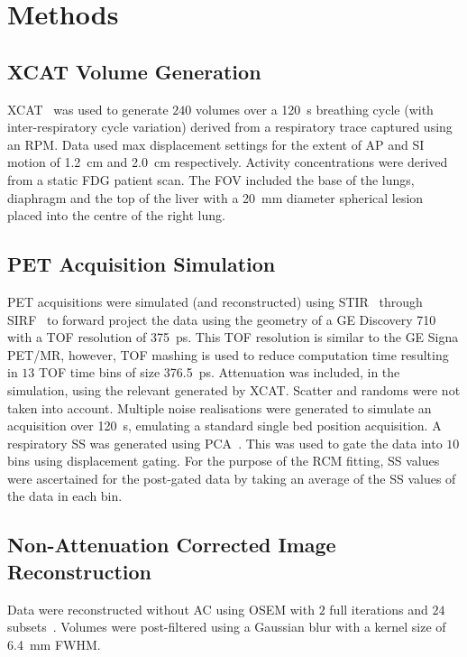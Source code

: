 \section{Methods} \label{sec:methods}
    \subsection{XCAT Volume Generation} \label{sec:xcat_volume_generation}
        \gls{XCAT}~\cite{Segars2010} was used to generate $240$ volumes over a \SI{120}{\second} breathing cycle (with inter-respiratory cycle variation) derived from a respiratory trace captured using an \gls{RPM}. Data used max displacement settings for the extent of \gls{AP} and \gls{SI} motion of \SI{1.2}{\centi\metre} and \SI{2.0}{\centi\metre} respectively. Activity concentrations were derived from a static \gls{FDG} patient scan. The \gls{FOV} included the base of the lungs, diaphragm and the top of the liver with a \SI{20}{\milli\metre} diameter spherical lesion placed into the centre of the right lung.
    
    \subsection{PET Acquisition Simulation} \label{sec:pet_acquisition_simulation}
        \gls{PET} acquisitions were simulated (and reconstructed) using \gls{STIR}~\cite{Thielemans2012, Efthimiou2018} through \gls{SIRF}~\cite{ Ovtchinnikov2019CCPPETMRSIRF} to forward project the data using the geometry of a \gls{GE} Discovery 710 with a \gls{TOF} resolution of \SI{375}{\pico\second}. This \gls{TOF} resolution is similar to the \gls{GE} Signa \gls{PET}/\gls{MR}, however, \gls{TOF} mashing is used to reduce computation time resulting in $13$ \gls{TOF} time bins of size \SI{376.5}{\pico\second}. Attenuation was included, in the simulation, using the relevant  generated by \gls{XCAT}. Scatter and randoms were not taken into account. Multiple noise realisations were generated to simulate an acquisition over \SI{120}{\second}, emulating a standard single bed position acquisition. A respiratory \gls{SS} was generated using \gls{PCA}~\cite{Thielemans2011}. This was used to gate the data into $10$ bins using displacement gating. For the purpose of the \gls{RCM} fitting, \gls{SS} values were ascertained for the post-gated data by taking an average of the \gls{SS} values of the data in each bin.
    
    \subsection{Non-Attenuation Corrected Image Reconstruction} \label{sec:non-attenuation_corrected_image_reconstruction}
        Data were reconstructed without \gls{AC} using \gls{OSEM} with $2$ full iterations and $24$ subsets~\cite{Hudson1994}. Volumes were post-filtered using a Gaussian blur with a kernel size of \SI{6.4}{\milli\metre} \gls{FWHM}.
    
